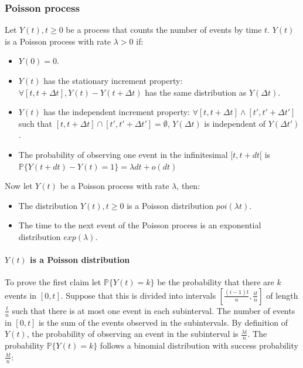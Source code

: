     \subsubsection{Poisson process}
    Let $Y(t), t\ge 0$ be a process that counts the number of events by time $t$.
    $Y(t)$ is a Poisson process with rate $\lambda>0$ if:

    \begin{multicols}{2}
      \begin{itemize}
        \item $Y(0) = 0$.
        \item $Y(t)$ has the stationary increment property: $\forall [t,t+\Delta t], Y(t)-Y(t+\Delta t)$ has the same distribution as $Y(\Delta t)$.
        \item $Y(t)$ has the independent increment property: $\forall [t,t+\Delta t]\land [t',t'+\Delta t']$ such that $[t,t+\Delta t]\cap [t', t'+\Delta t']=\emptyset$, $Y(\Delta t)$ is independent of $Y(\Delta t')$.
        \item The probability of observing one event in the infinitesimal $[t, t+dt[$ is $\mathbb{P}\{Y(t+dt)-Y(t) = 1\} = \lambda dt + o(dt)$
      \end{itemize}
    \end{multicols}

    Now let $Y(t)$ be a Poisson process with rate $\lambda$, then:

    \begin{multicols}{2}
      \begin{itemize}
        \item The distribution $Y(t), t\ge 0$ is a Poisson distribution $poi(\lambda t)$.
        \item The time to the next event of the Poisson process is an exponential distribution $exp(\lambda)$.
      \end{itemize}
    \end{multicols}

      \paragraph{$Y(t)$ is a Poisson distribution}
      To prove the first claim let $\mathbb{P}\{Y(t)=k\}$ be the probability that there are $k$ events in $[0,t]$.
      Suppose that this is divided into intervals $[\frac{(i-1)t}{n},\frac{it}{n}]$ of length $\frac{t}{n}$ such that there is at most one event in each subinterval.
      The number of events in $[0,t]$ is the sum of the events observed in the subintervals.
      By definition of $Y(t)$, the probability of observing an event in the subinterval is $\frac{\lambda t}{n}$.
      The probability $\mathbb{P}\{Y(t) = k\}$ follows a binomial distribution with success probability $\frac{\lambda t}{n}$:

